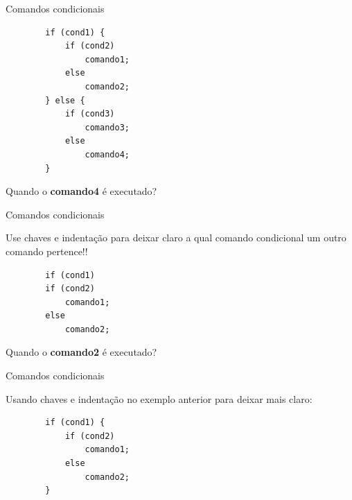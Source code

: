 \documentclass[handout]{beamer}
\begin{document}
\begin{frame}[fragile]{Comandos condicionais}

    \begin{verbatim}
        if (cond1) {
            if (cond2)
                comando1;
            else
                comando2;
        } else {
            if (cond3)
                comando3;
            else
                comando4;
        }
    \end{verbatim}

    Quando o {\bf comando4} é executado?
\end{frame}

\begin{frame}[fragile]{Comandos condicionais}

    Use chaves e indentação para deixar claro a qual comando condicional um outro comando pertence!!

    \begin{verbatim}
        if (cond1)
        if (cond2)
            comando1;
        else
            comando2;
    \end{verbatim}

    Quando o {\bf comando2} é executado?
\end{frame}

\begin{frame}[fragile]{Comandos condicionais}

    Usando chaves e indentação no exemplo anterior para deixar mais claro:

    \begin{verbatim}
        if (cond1) {
            if (cond2)
                comando1;
            else
                comando2;
        }
    \end{verbatim}
\end{frame}
\end{document}
